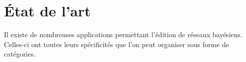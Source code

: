\documentclass[conference]{IEEEtran}
\begin{document}




\section{État de l'art}
Il existe de nombreuses applications permettant l'édition de réseaux bayésiens. Celles-ci ont toutes leurs spécificités que l'on peut organiser sous forme de catégories. \\
\end{document}

